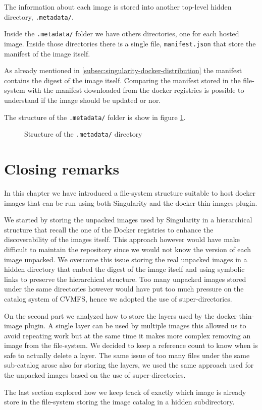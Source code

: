 The information about each image is stored into another top-level hidden
directory, \texttt{.metadata/}.

Inside the \texttt{.metadata/} folder we have others directories, one for each
hosted image.  Inside those directories there is a single file,
\texttt{manifest.json} that store the manifest of the image itself.

As already mentioned in \ref{subsec:singularity-docker-distribution} the
manifest contains the digest of the image itself.  Comparing the manifest
stored in the file-system with the manifest downloaded from the docker
registries is possible to understand if the image should be updated or nor.

The structure of the \texttt{.metadata/} folder is show in figure
\ref{fig:metadata-folder-structure}.

\begin{figure}
\caption{Structure of the \texttt{.metadata/} directory}
\label{fig:metadata-folder-structure}
\end{figure}

\section{Closing remarks}

In this chapter we have introduced a file-system structure suitable to host
docker images that can be run using both Singularity and the docker thin-images
plugin.

We started by storing the unpacked images used by Singularity in a hierarchical
structure that recall the one of the Docker registries to enhance the
discoverability of the images itself. This approach however would have make
difficult to maintain the repository since we would not know the version of
each image unpacked. We overcome this issue storing the real unpacked images in
a hidden directory that embed the digest of the image itself and using symbolic
links to preserve the hierarchical structure. Too many unpacked images stored
under the same directories however would have put too much pressure on the
catalog system of CVMFS, hence we adopted the use of super-directories.

On the second part we analyzed how to store the layers used by the docker
thin-image plugin. A single layer can be used by multiple images this allowed
us to avoid repeating work but at the same time it makes more complex removing
an image from the file-system. We decided to keep a reference count to know
when is safe to actually delete a layer. The same issue of too many files under
the same sub-catalog arose also for storing the layers, we used the same
approach used for the unpacked images based on the use of super-directories.

The last section explored how we keep track of exactly which image is already
store in the file-system storing the image catalog in a hidden subdirectory.
